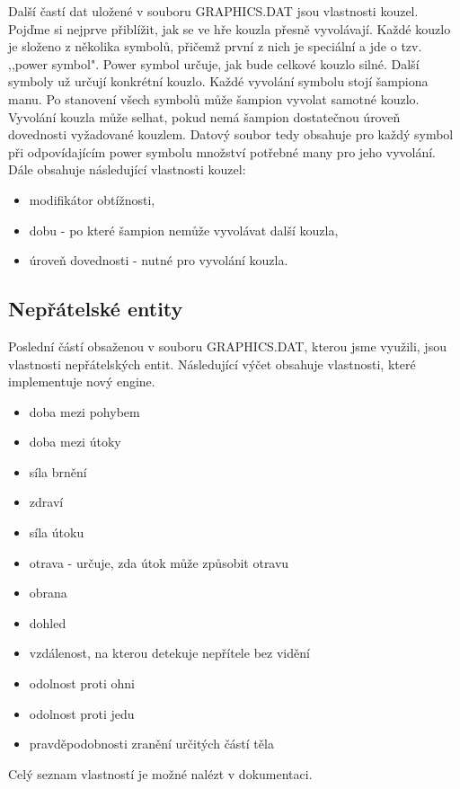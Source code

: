 Další častí dat uložené v souboru GRAPHICS.DAT jsou vlastnosti kouzel. Pojďme si nejprve přiblížit,
jak se ve hře kouzla přesně vyvolávají. Každé kouzlo je složeno z několika symbolů, přičemž první 
z nich je speciální a jde o tzv. ,,power symbol". Power symbol určuje, jak bude celkové kouzlo silné.
Další symboly už určují konkrétní kouzlo. Každé vyvolání symbolu stojí šampiona manu. Po stanovení 
všech symbolů může šampion vyvolat samotné kouzlo. Vyvolání kouzla může selhat, pokud nemá šampion 
dostatečnou úroveň dovednosti vyžadované kouzlem. Datový soubor tedy obsahuje pro každý symbol při odpovídajícím
power symbolu množství potřebné many pro jeho vyvolání. Dále obsahuje následující vlastnosti kouzel\cite{DMSpells}:

\begin{itemize}
\item modifikátor obtížnosti,
\item dobu - po které šampion nemůže vyvolávat další kouzla,
\item úroveň dovednosti - nutné pro vyvolání kouzla.
\end{itemize}

\subsection{Nepřátelské entity}\label{properties-creatures}

Poslední částí obsaženou v souboru GRAPHICS.DAT, kterou jsme využili, jsou vlastnosti nepřátelských entit.
Následující výčet obsahuje vlastnosti, které implementuje nový engine. 
\begin{itemize}
\item doba mezi pohybem 
\item doba mezi útoky
\item síla brnění
\item zdraví
\item síla útoku
\item otrava - určuje, zda útok může způsobit otravu
\item obrana 
\item dohled 
\item vzdálenost, na kterou detekuje nepřítele bez vidění 
\item odolnost proti ohni
\item odolnost proti jedu
\item pravděpodobnosti zranění určitých částí těla
\end{itemize}

Celý seznam vlastností je možné nalézt v dokumentaci\cite{DMCreatures}.


